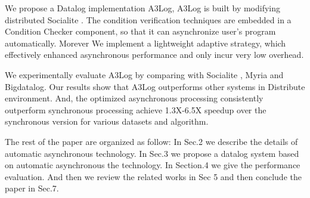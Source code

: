 \begin{itemize}
{	\item We propose a Datalog implementation A3Log, A3Log is built by modifying distributed Socialite \cite{Seo:2013:DSD:2556549.2556572}. The condition verification techniques are embedded in a Condition Checker component, so that it can asynchronize user's program automatically. Morever We implement a lightweight adaptive strategy, which effectively enhanced asynchronous performance and only incur very low overhead.
	
	\item We experimentally evaluate A3Log by comparing with Socialite\cite{Lam:2013:SDE:2510649.2511289} , %
	 Myria\cite{Wang:2015:AFR:2824032.2824052} and Bigdatalog\cite{Shkapsky:2016:BDA:2882903.2915229}.
	 Our results show that A3Log outperforms other systems in Distribute environment. And, the optimized asynchronous processing consistently outperform synchronous processing achieve 1.3X-6.5X speedup over the synchronous version for various datasets and algorithm.
	}
\end{itemize}

The rest of the paper are organized as follow: In Sec.2 we describe the details of  automatic asynchronous technology. In Sec.3 we propose a datalog system based on automatic asynchronous the technology. In Section.4  we give the performance evaluation. And then we review the related works in Sec 5 and then conclude the paper in Sec.7.


